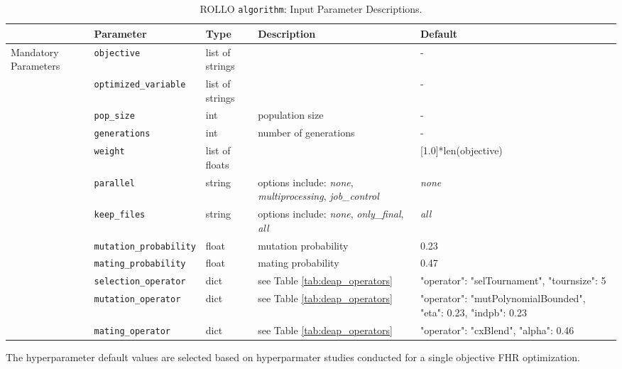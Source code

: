 \begin{table}[]
    \centering
    \onehalfspacing
    \caption{\acrfull{ROLLO} \texttt{algorithm}: Input Parameter Descriptions.}
	\label{tab:algorithm-inputs}
    \footnotesize
    \begin{tabular}{l|lp{1.7cm}p{4cm}p{3cm}}
    \hline
    & \textbf{Parameter} & \textbf{Type} & \textbf{Description} & \textbf{Default} \\
    \hline
    \multirow{9}{1.8cm}{Mandatory Parameters} 
    & \texttt{objective} & list of strings & & -\\
    \cline{2-5}
    & \texttt{optimized\_variable} & list of strings & & -\\
    \cline{2-5}
    & \texttt{pop\_size} & int & population size & -\\
    \cline{2-5}
    & \texttt{generations} & int & number of generations & -\\
    \hline
    \multirow{9}{1.8cm}{Optional Parameters} 
    & \texttt{weight} & list of floats & & \scriptsize{[1.0]*len(objective)}\\
    \cline{2-5}
    & \texttt{parallel} & string & options include: \textit{none}, \textit{multiprocessing}, \textit{job\_control} & \textit{none} \\
    \cline{2-5}
    & \texttt{keep\_files} & string & options include: \textit{none}, \textit{only\_final}, \textit{all} & \textit{all} \\
    \cline{2-5}
    & \texttt{mutation\_probability} & float & mutation probability & 0.23 \\
    \cline{2-5}
    & \texttt{mating\_probability} & float & mating probability & 0.47 \\
    \cline{2-5}
    & \texttt{selection\_operator} & dict & see Table \ref{tab:deap_operators} & \scriptsize{{"operator": "selTournament", "tournsize": 5}}\\
    \cline{2-5}
    & \texttt{mutation\_operator} & dict & see Table \ref{tab:deap_operators} & \scriptsize{{"operator": "mutPolynomialBounded", "eta": 0.23, "indpb": 0.23}}\\
    \cline{2-5}
    & \texttt{mating\_operator} & dict & see Table \ref{tab:deap_operators} & \scriptsize{{"operator": "cxBlend", "alpha": 0.46}}\\
    \hline 
    \end{tabular}
    \end{table}
The hyperparameter default values are selected based on hyperparmater studies conducted for a 
single objective \gls{FHR} optimization. 

